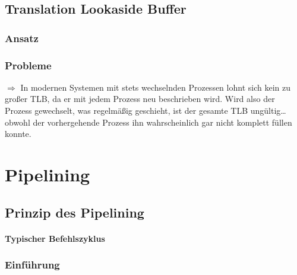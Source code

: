 \section{Translation Lookaside Buffer}


\subsection{Ansatz}

\subsection{Probleme}
$\Rightarrow$ In modernen Systemen mit stets wechselnden Prozessen lohnt sich kein zu großer TLB, da er mit jedem Prozess neu beschrieben wird. Wird also der Prozess gewechselt, was regelmäßig geschieht, ist der gesamte TLB ungültig… obwohl der vorhergehende Prozess ihn wahrscheinlich gar nicht komplett füllen konnte.

\chapter{Pipelining}


\section{Prinzip des Pipelining}

\subsubsection{Typischer Befehlszyklus}

\subsection{Einführung}

